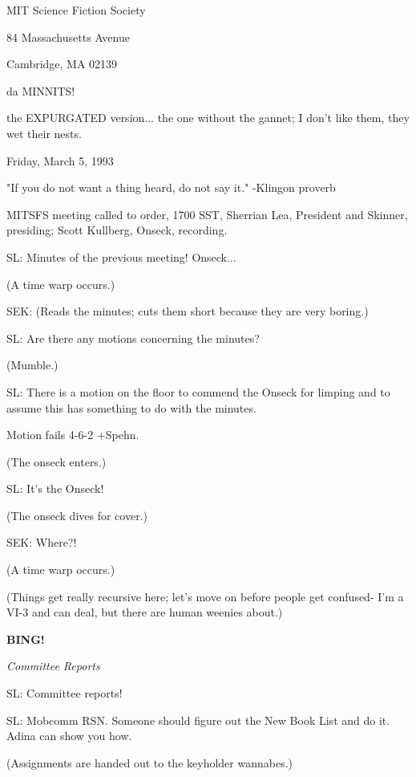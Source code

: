 \documentclass[12pt]{article}
\newcommand{\bing}{{\bf BING!} }
\newcommand{\goto}[1]{\bing \vskip 12pt \centerline{{\em{#1}}}}
\begin{document}
\begin{center}

MIT Science Fiction Society 

84 Massachusetts Avenue

Cambridge, MA 02139

\vspace{12pt}

da MINNITS!

the EXPURGATED version... the one without the gannet; I don't like them, they wet their nests.

Friday, March 5, 1993

"If you do not want a thing heard, do not say it." -Klingon proverb

\end{center}
 
\vspace{18pt}

\setlength{\parskip}{6pt}

\noindent
MITSFS meeting called to order, 1700 SST,
Sherrian Lea, President and Skinner, presiding; Scott Kullberg, Onseck, recording.

SL: Minutes of the previous meeting! Onseck...

(A time warp occurs.)

SEK: (Reads the minutes; cuts them short because they are very boring.)

SL: Are there any motions concerning the minutes?

(Mumble.)

SL: There is a motion on the floor to commend the Onseck for limping and to assume this has something to do with the minutes.

Motion fails 4-6-2 +Spehn.

(The onseck enters.)

SL: It's the Onseck!

(The onseck dives for cover.)

SEK: Where?!

(A time warp occurs.)

(Things get really recursive here; let's move on before people get confused- I'm a VI-3 and can deal, but there are human weenies about.)

\goto{Committee Reports}

SL: Committee reports!

SL: Mobcomm RSN. Someone should figure out the New Book List and do it. Adina can show you how.

(Assignments are handed out to the keyholder wannabes.)
\end{document}
